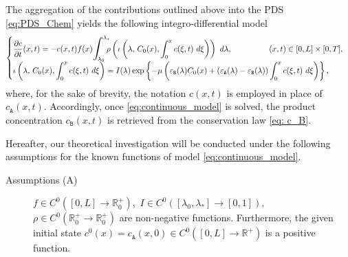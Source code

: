 \documentclass[a4paper, UKenglish, numberwithinsect, thm-restate]{tgdk-v2021}
\begin{document}
The aggregation of the contributions outlined above into the PDS \eqref{eq:PDS_Chem} yields the following integro-differential model
\begin{equation}\label{eq:continuous_model}
    \begin{cases}
         \displaystyle\dfrac{\partial c}{\partial t}(x,t)=- c(x,t) f(x)\scalebox{1.3}{$\displaystyle\int$}_{\!\!\!\!\! \lambda_{0}}^{\lambda_{*}} \!\!\! \rho\left(\iota\left(\lambda,\, C_0(x), \int_0^x    c(\xi,t)  \ d\xi\right)\right) \ d\lambda, \qquad\qquad \ \ (x,t)\in [0,L]\times [0,T], \\
         \displaystyle \iota  \left(  \lambda,\, C_0(x),  \int_0^x   c(\xi,t) \ d\xi  \right)  =  I(\lambda) \exp  \left\{  -  \mu  \left(  \varepsilon_\texttt{B}(\lambda) C_0(x) +  (\varepsilon_\texttt{A}(\lambda) -\varepsilon_\texttt{B}(\lambda))  \int_0^x    c(\xi,t)  \ d\xi  \right)  \right\},
    \end{cases}
\end{equation}
where, for the sake of brevity, the notation $c(x,t)$ is employed in place of $c_{\texttt{A}}(x,t).$ Accordingly, once \eqref{eq:continuous_model} is solved, the product concentration $c_{\texttt{B}}(x,t)$ is retrieved from the conservation law \eqref{eq: c_B}.

Hereafter, our theoretical investigation will be conducted under the following assumptions for the known functions of model \eqref{eq:continuous_model}.

\begin{description}
\item[Assumptions (A)]\label{ass:1} $f\in C^0([0,L]\to \mathbb{R}^+_0),$ $I\in C^0([\lambda_{0},\lambda_{*}]\to [0,1]),$  $\rho\in C^0(\mathbb{R}^+_0 \to \mathbb{R}^+_0)$ are non-negative functions. Furthermore, the given initial state $c^0(x)=c_{\texttt{A}}(x,0)\in C^0([0,L]\to \mathbb{R}^+)$ is a  positive function.
\end{description}
\end{document}
